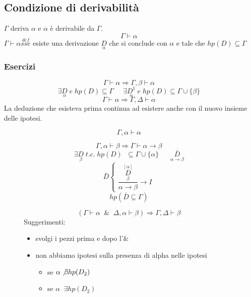 \documentclass{article}
\theoremstyle{break}
\theoremstyle{break}
\theoremstyle{break}
\theoremstyle{break}
\begin{document}
\subsection{Condizione di derivabilità}
\( \Gamma \) deriva \( \alpha \) e \( \alpha \) è derivabile da \( \Gamma \).
\[
  \Gamma \vdash \alpha
\] 
\(
\Gamma \vdash \alpha \stackrel{def}{sse}
\) esiste una derivazione \(\underset{\alpha}{D}\) che si conclude con \( \alpha \) e
tale che \( hp(D) \subseteq \Gamma \) 
\subsubsection{Esercizi}
\begin{exercise}
  \[
    \Gamma \vdash \alpha \Rightarrow \Gamma,\beta \vdash \alpha
  \] 
  \[
    \exists \underset{\alpha}{D}\; e\; hp(D) \subseteq \Gamma \;\;\;\;\; \exists \underset{\alpha}{D^1} \; e \; hp(D) \subseteq \Gamma \cup \{\beta\} 
  \] 
  \[
    \Gamma \vdash \alpha \Rightarrow \Gamma, \Delta \vdash \alpha
  \] 
  La deduzione che esisteva prima continua ad esistere anche con il nuovo insieme delle ipotesi.
\end{exercise}
\begin{exercise}[a casa]
  \[
    \Gamma, \alpha \vdash \alpha
  \] 
\end{exercise}
\begin{exercise}
  \[
    \Gamma,\alpha \vdash \beta \Rightarrow \Gamma \vdash \alpha \to \beta
  \] 
  \[
    \exists \underset{\beta}{D}\; t.c.\; hp(D)\;\; \subseteq \Gamma \cup \{\alpha\} \;\;\;\;\;\; \bar{\underset{\alpha \to \beta}{D}} 
  \] 
  \[
    \bar{D} \begin{cases}
      \dfrac{\underset{\beta}{\stackrel{[\alpha]}{D}}}{\alpha \to \beta} \to I
    \end{cases}
  \] 
  \[
    hp(\bar{D} \subseteq \Gamma)
  \] 
\end{exercise}
\begin{figure}[H]
  \begin{exercise}[a casa]
    \[
      (\Gamma \vdash \alpha\;\; \&\;\; \Delta, \alpha \vdash \beta) \Rightarrow \Gamma, \Delta \vdash \beta
    \] 
    Suggerimenti:
    \begin{itemize}
      \item svolgi i pezzi prima e dopo l'\&
      \item non abbiamo ipotesi sulla presenza di alpha nelle ipotesi
        \begin{itemize}
          \item se \( \alpha \not\exists hp(D_2)  \) 
          \item se \( \alpha\;\; \exists hp(D_2)  \) 
        \end{itemize}
    \end{itemize}

  \end{exercise}
\end{figure}
\end{document}
